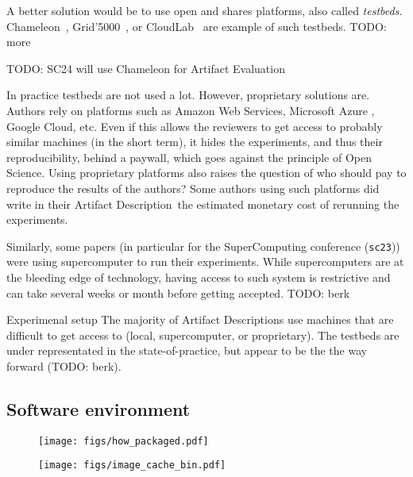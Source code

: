 \documentclass[sigconf,natbib=false]{acmart}
\newcommand{\ad}{Artifact Description}
\newcommand{\aeval}{Artifact Evaluation}
\newcommand{\todo}[1]{{\color{red}TODO: #1}}
\begin{document}
A better solution would be to use open and shares platforms, also called \emph{testbeds}.
Chameleon\ \cite{chameleon}, Grid'5000\ \cite{grid5000}, or CloudLab\ \cite{cloudlab} are example of such testbeds.
\todo{more \cite{nussbaum2017testbeds}}

\todo{SC24 will use Chameleon for \aeval}

In practice testbeds are not used a lot.
However, proprietary solutions are.
Authors rely on platforms such as Amazon Web Services, Microsoft Azure , Google Cloud, etc.
Even if this allows the reviewers to get access to probably similar machines (in the short term), it hides the experiments, and thus their reproducibility, behind a paywall, which goes against the principle of Open Science.
Using proprietary platforms also raises the question of who should pay to reproduce the results of the authors?
Some authors using such platforms did write in their \ad\ the estimated monetary cost of rerunning the experiments.

Similarly, some papers (in particular for the SuperComputing conference (\texttt{sc23})) were using supercomputer to run their experiments.
While supercomputers are at the bleeding edge of technology, having access to such system is restrictive and can take several weeks or month before getting accepted.
\todo{berk}

\begin{lesson}{Experimenal setup}{}
  The majority of \ad s use machines that are difficult to get access to (local, supercomputer, or proprietary). 
  The testbeds are under representated in the state-of-practice, but appear to be the the way forward \cite{nussbaum2017testbeds} (\todo{berk}).
\end{lesson}

\subsection{Software environment}\label{sec:sop:sw}

\begin{figure*}
  \centering
  \begin{subfigure}{0.49\textwidth}
    \centering
    \texttt{[image: figs/how\_packaged.pdf]}
  \caption{}\label{fig:techno}
  \end{subfigure}
  \begin{subfigure}{0.49\textwidth}
      \centering
      \texttt{[image: figs/image\_cache\_bin.pdf]}
    \caption{}\label{fig:cache_bin}
  \end{subfigure}
  \caption{\todo{}}\label{fig:techo_cache}
\end{figure*}
\end{document}
